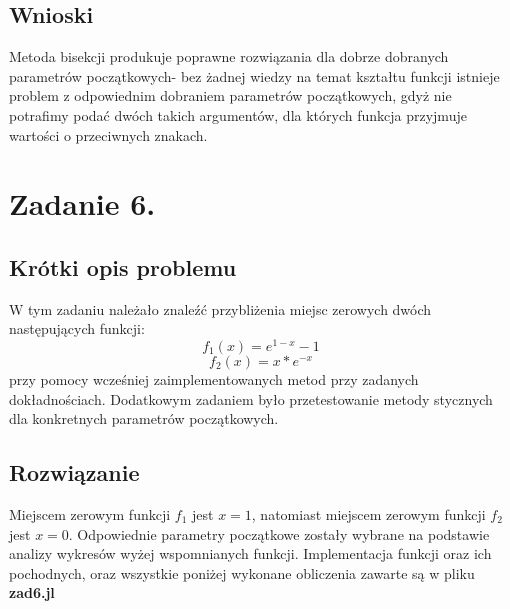 \documentclass[a4paper,14pt]{report}
\begin{document}
  \section{Wnioski}
    Metoda bisekcji produkuje poprawne rozwiązania dla dobrze dobranych parametrów początkowych- bez żadnej wiedzy na temat kształtu funkcji istnieje problem z odpowiednim dobraniem parametrów początkowych, gdyż nie potrafimy podać dwóch takich argumentów, dla których funkcja przyjmuje wartości o przeciwnych znakach.
\chapter{Zadanie 6.}
  \section{Krótki opis problemu}
    W tym zadaniu należało znaleźć przybliżenia miejsc zerowych dwóch następujących funkcji:
    \begin{equation}
    f_{1}(x)=e^{1-x}-1
    \end{equation}
    \begin{equation}
    f_{2}(x)=x*e^{-x}
    \end{equation}
    przy pomocy wcześniej zaimplementowanych metod przy zadanych dokładnościach. Dodatkowym zadaniem było przetestowanie metody stycznych dla konkretnych parametrów początkowych.
  \section{Rozwiązanie}
    Miejscem zerowym funkcji $f_{1}$ jest $x=1$, natomiast miejscem zerowym funkcji $f_{2}$ jest $x=0$. Odpowiednie parametry początkowe zostały wybrane na podstawie analizy wykresów wyżej wspomnianych funkcji.
    Implementacja funkcji oraz ich pochodnych, oraz wszystkie poniżej wykonane obliczenia zawarte są w pliku \textbf{zad6.jl}
\end{document}
